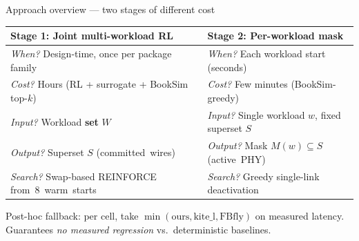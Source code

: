 \documentclass[aspectratio=169]{beamer}
\begin{document}
\begin{frame}{Approach overview — two stages of different cost}
\centering
\begin{tabular}{p{} p{}}
\toprule
\textbf{Stage 1: Joint multi-workload RL} & \textbf{Stage 2: Per-workload mask} \\
\midrule
\emph{When?} Design-time, once per package family &
\emph{When?} Each workload start (seconds) \\
\midrule
\emph{Cost?} Hours (RL + surrogate + BookSim top-$k$) &
\emph{Cost?} Few minutes (BookSim-greedy) \\
\midrule
\emph{Input?} Workload \textbf{set} $W$ &
\emph{Input?} Single workload $w$, fixed superset $S$ \\
\midrule
\emph{Output?} Superset $S$ \mbox{(committed wires)} &
\emph{Output?} Mask $M(w) \subseteq S$ \mbox{(active PHY)} \\
\midrule
\emph{Search?} Swap-based REINFORCE \mbox{from 8 warm starts} &
\emph{Search?} Greedy single-link deactivation \\
\bottomrule
\end{tabular}

\vspace{0.5em}
\footnotesize
Post-hoc fallback: per cell, take $\min(\text{ours}, \text{kite\_l}, \text{FBfly})$
on measured latency. Guarantees \emph{no measured regression} vs.\
deterministic baselines.
\end{frame}
\end{document}
